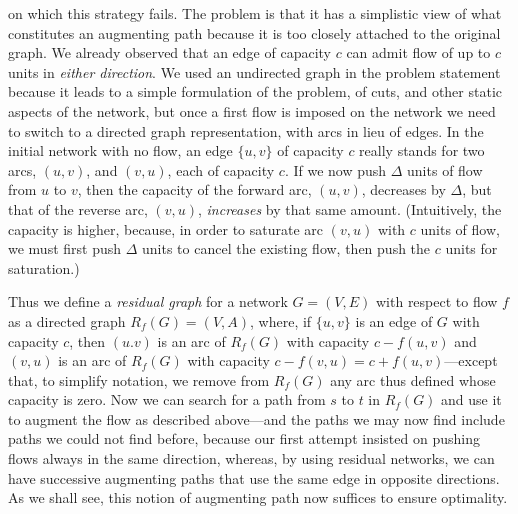 \documentclass[11pt]{article}
\begin{document}
on which this strategy fails.  The problem is that it has a simplistic view
of what constitutes an augmenting path because it is too closely attached
to the original graph.   We already observed that an edge of capacity $c$
can admit flow of up to $c$ units in \emph{either direction}.  We used an
undirected graph in the problem statement because it leads to a simple
formulation of the problem, of cuts, and other static aspects of the
network, but once a first flow is imposed on the network we need to
switch to a directed graph representation, with arcs in lieu of edges.
In the initial network with no flow, an edge $\{u,v\}$ of capacity $c$
really stands for two arcs, $(u,v)$, and $(v,u)$, each of capacity $c$.
If we now push $\Delta$ units of flow from $u $ to $v$, then the
capacity of the forward arc, $(u,v)$, decreases by $\Delta$, but that
of the reverse arc, $(v,u)$, \emph{increases} by that same amount.
(Intuitively, the capacity is higher, because, in order to saturate
arc $(v,u)$ with $c$ units of flow, we must first push $\Delta$ units
to cancel the existing flow, then push the $c$ units for saturation.)

Thus we define a \emph{residual graph} for a network $G=(V,E)$ with respect
to flow $f$ as a directed graph $R_f(G)=(V,A)$, where, if $\{u,v\}$ is
an edge of $G$ with capacity $c$, then $(u.v)$ is an arc of $R_f(G)$ with
capacity $c-f(u,v)$ and $(v,u)$ is an arc of $R_f(G)$ with capacity
$c-f(v,u)=c+f(u,v)$---except that, to simplify notation, we remove from
$R_f(G)$ any arc thus defined whose capacity is zero.  Now we can search
for a path from $s$ to $t$ in $R_f(G)$ and use it to augment the flow
as described above---and the paths we may now find include paths we could
not find before, because our first attempt insisted on pushing flows always
in the same direction, whereas, by using residual networks, we can have
successive augmenting paths that use the same edge in opposite directions.
As we shall see, this notion of augmenting path now suffices to ensure
optimality.
\end{document}
